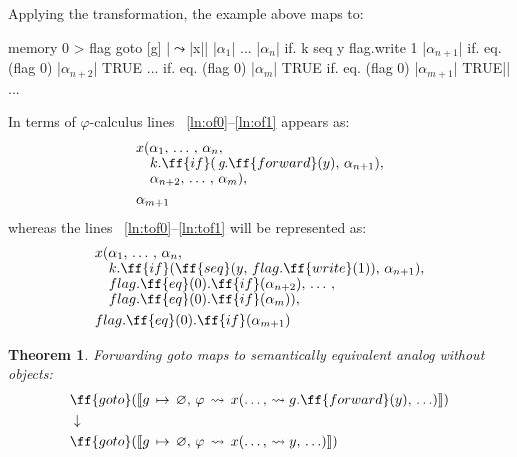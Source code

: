\documentclass[sigplan,review,11pt,nonacm,natbib=false]{acmart}
\theoremstyle{theorems}
\newtheorem{eotheorem}{Theorem}
\newcommand\br{\\[-4pt]}
\begin{document}

    Applying the transformation, the example above maps
    to:
    \begin{ffcode}
        memory 0 > flag
        goto
        [g]
        |$\leadsto$|x|$\label{ln:tof0}$|
        |$\alpha_1$|
        ...
        |$\alpha_n$|
        if.
        k
        seq
        y
        flag.write 1
        |$\alpha_{n+1}$|
        if.
        eq. (flag 0)
        |$\alpha_{n+2}$|
        TRUE
        ...
        if.
        eq. (flag 0)
        |$\alpha_{m}$|
        TRUE
        if.
        eq. (flag 0)
        |$\alpha_{m+1}$|
        TRUE|$\label{ln:tof1}$|
        ...
    \end{ffcode}

    In terms of $\varphi$-calculus lines ~\ref{ln:of0}--\ref{ln:of1} appears as:
    \begin{equation}
        \begin{split}
            & x (\alpha_1,\,\ldots\,,\,\alpha_n, \br
            & \quad k.\ff{if}(\,\emph{g}.\ff{forward}( y ),\,\alpha_{n+1}),\br
            & \quad \alpha_{n+2},\,\ldots\,,\,\alpha_m), \\
            & \alpha_{m+1} \\
        \end{split}
    \end{equation}
    whereas the lines ~\ref{ln:tof0}--\ref{ln:tof1} will be represented as:
    \begin{equation}
        \begin{split}
            & x (\alpha_1,\,\ldots\,,\,\alpha_n, \br
            & \quad k.\ff{if}(\ff{seq}(y,\,flag.\ff{write}(1)),\,\alpha_{n+1}),\br
            & \quad flag.\ff{eq}(0).\ff{if}(\alpha_{n+2}),\,\ldots\,,\br
            & \quad flag.\ff{eq}(0).\ff{if}(\alpha_m)), \\
            & flag.\ff{eq}(0).\ff{if}(\alpha_{m+1}) \\
        \end{split}
    \end{equation}

    \begin{eotheorem}
        \emph{Forwarding goto} maps to semantically equivalent analog without  objects:
        \begin{equation*}
            \begin{split}
                & \ff{goto}(\llbracket g\,\mapsto\,\varnothing,\,\varphi\,\leadsto\,x(\ldots,\,\leadsto g.\ff{forward}(y),\,\ldots)\rrbracket) \\
                & \downarrow \\
                & \ff{goto}(\llbracket g\,\mapsto\,\varnothing,\,\varphi\,\leadsto\,x(\ldots,\,\leadsto y,\,\ldots)\rrbracket) \\
            \end{split}
        \end{equation*}
    \end{eotheorem}
\end{document}
